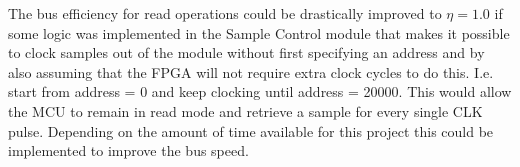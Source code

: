 The bus efficiency for read operations could be drastically improved to $\eta = 1.0$ if some logic was implemented in the Sample Control module that makes it possible to clock samples out of the module without first specifying an address and by also assuming that the FPGA will not require extra clock cycles to do this. I.e. start from address = 0 and keep clocking until address = 20000. This would allow the MCU to remain in read mode and retrieve a sample for every single CLK pulse. Depending on the amount of time available for this project this could be implemented to improve the bus speed.